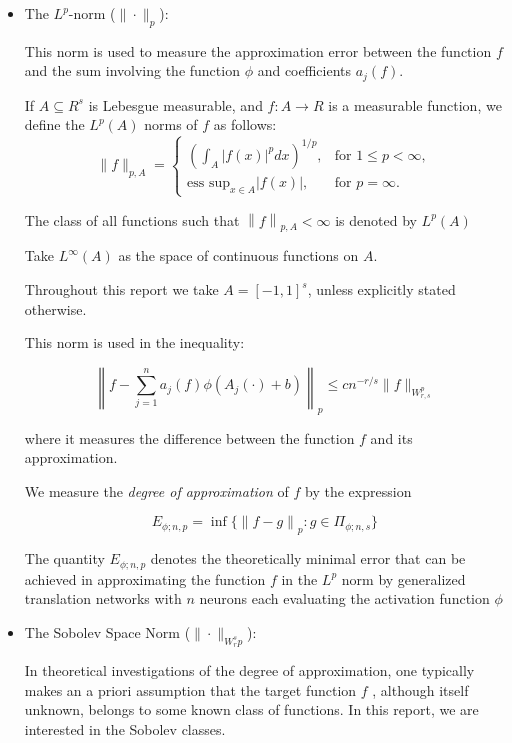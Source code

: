\documentclass{article}
\begin{document}
\begin{itemize}
\item The \( L^p \)-norm (\( \|\cdot\|_p \)):

This norm is used to measure the approximation error between the function \( f \) and the sum involving the function \( \phi \) and coefficients \( a_j(f) \).

If \( A \subseteq R^{s}\) is Lebesgue measurable, and \(f : A \to R\) is a measurable function, we define the \(L^{p} (A)\) norms of \(f\) as follows:   
   \[
   \|f\|_{p,A} = 
   \begin{cases} 
   \left( \int_{A} |f(x)|^p dx \right)^{1/p}, & \text{for } 1 \leq p < \infty, \\
   \text{ess sup}_{x \in A} |f(x)|, & \text{for } p = \infty.
   \end{cases}
   \]


   The class of all functions such that \(\left\lVert f\right\rVert_{p,A} < \infty \) is denoted by \(L^p(A)\) 

   Take \(L^{\infty }(A)\) as the space of continuous functions on \(A\).

   Throughout this report we take \(A = [-1,1]^s\), unless explicitly stated otherwise.

   This norm is used in the inequality:

   \[ \left\|f - \sum_{j=1}^{n} a_j(f) \phi(A_j(\cdot) + b)\right\|_p \leq c n^{-r/s} \|f\|_{W^p_{r,s}} \]

   where it measures the difference between the function \( f \) and its approximation.

   We measure the \textit{degree of approximation} of \(f\) by the expression

   \[
    E_{\phi;n,p} = \inf\{ \left\| f - g \right\|_p : g \in \Pi_{\phi ; n,s} \}
   \]

   The quantity \(E_{\phi ; n,p}\)  denotes the theoretically minimal error that can be achieved in approximating the function \(f\)  in the \(L^p\)  norm by generalized translation networks with \(n\)  neurons each evaluating the activation function \(\phi \) 

\item The Sobolev Space Norm (\( \|\cdot\|_{W_r^s p} \)):

In theoretical investigations of the degree of approximation, one typically makes an a priori assumption
that the target function \(f\) , although itself unknown, belongs to some known class of functions. In this report, we are interested in the Sobolev classes.


\end{itemize}
\end{document}
